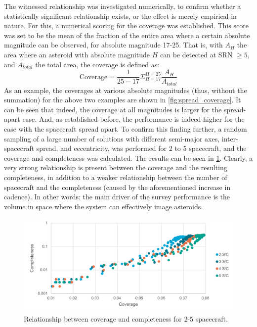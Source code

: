 The witnessed relationship was investigated numerically, to confirm whether a statistically significant relationship exists, or the effect is merely empirical in nature. For this, a numerical scoring for the coverage was established. This score was set to be the mean of the fraction of the entire area where a certain absolute magnitude can be observed, for absolute magnitude 17-25. That is, with $A_{H}$ the area where an asteroid with absolute magnitude $H$ can be detected at SRN $\geq 5$, and $A_{total}$ the total area, the coverage is defined as:
\begin{equation}
 \mathrm{Coverage} = \frac{1}{25-17}\Sigma_{H=17}^{H=25} \frac{A_{H}}{A_{total}}
\end{equation}
As an example, the coverages at various absolute magnitudes (thus, without the summation) for the above two examples are shown in \autoref{fig:spread_coverage}. It can be seen that indeed, the coverage at all magnitudes is larger for the spread-apart case. And, as established before, the performance is indeed higher for the case with the spacecraft spread apart. To confirm this finding further, a random sampling of a large number of solutions with different semi-major axes, inter-spacecraft spread, and eccentricity, was performed for 2 to 5 spacecraft, and the coverage and completeness was calculated. The results can be seen in \ref{fig:coverage_completeness}. Clearly, a very strong relationship is present between the coverage and the resulting completeness, in addition to a weaker relationship between the number of spacecraft and the completeness (caused by the aforementioned increase in cadence). In other words: the main driver of the survey performance is the volume in space where the system can effectively image asteroids. \\

\begin{figure}[htbp]
 \centering
 \includegraphics[width=1.0\textwidth]{img/coverage_completeness.pdf}
 \caption{Relationship between coverage and completeness for 2-5 spacecraft. }
 \label{fig:coverage_completeness}
\end{figure}

